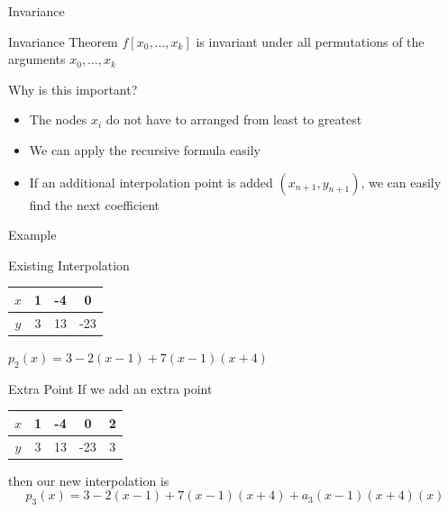 \documentclass[10pt]{beamer}
\begin{document}
\begin{frame}{Invariance}
\begin{block}{Invariance Theorem}
    $f[x_0,\dots,x_k]$ is invariant under all permutations of the arguments
    $x_0,\dots,x_k$
\end{block}
\vspace{4mm}

Why is this important? 
\begin{itemize}
    \item The nodes $x_i$ do not have to arranged from least to greatest 
    \item We can apply the recursive formula easily 
    \item If an additional interpolation point is added $(x_{n+1}, y_{n+1})$, we can easily find the next coefficient
\end{itemize}


\end{frame}
\begin{frame}{Example}
    \begin{block}{Existing Interpolation}
      \begin{center}
    \begin{tabular}{c | c c c}
      $x$ & 1 & -4 & 0\\\hline
      $y$ & 3 & 13 & -23\\
    \end{tabular}
  \quad $p_2(x) = 3 -2(x-1) + 7(x-1)(x+4)$
  \end{center}
    \end{block}
    \begin{block}{Extra Point}
        If we add an extra point
              \begin{center}
    \begin{tabular}{c | c c c c}
      $x$ & 1 & -4 & 0   &2\\\hline
      $y$ & 3 & 13 & -23 &3 \\
    \end{tabular}
  \end{center}
   then our new interpolation is
   $$p_3(x) = 3 -2(x-1) + 7(x-1)(x+4)+a_3(x-1)(x+4)(x)$$
    \end{block}

\end{frame}
\end{document}
